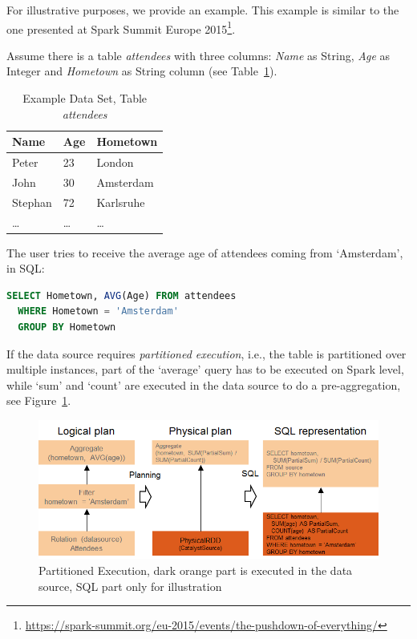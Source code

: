 \documentclass{article}
\begin{document}
For illustrative purposes, we provide an example. This example is similar to the one presented at Spark Summit Europe 2015\footnote{\url{https://spark-summit.org/eu-2015/events/the-pushdown-of-everything/}}. 

Assume there is a table \textit{attendees} with three columns: \textit{Name} as String, \textit{Age} as Integer and \textit{Hometown} as String column (see Table~\ref{tab:exampleData}).

\begin{table}[htb]
\centering
	\begin{tabular}{ l | l | l }
  		\textbf{Name} & \textbf{Age} & \textbf{Hometown} \\
  		\hline
  		Peter & 23 & London \\
  		\hline
  		John & 30 & Amsterdam \\
  		\hline
  		Stephan & 72 & Karlsruhe \\
  		\hline
  		\ldots & \ldots & \ldots \\
	\end{tabular}
	\caption{Example Data Set, Table \textit{attendees}}
	\label{tab:exampleData}
\end{table} 

The user tries to receive the average age of attendees coming from `Amsterdam', in SQL: 

\begin{lstlisting}[frame=none,language=sql]
SELECT Hometown, AVG(Age) FROM attendees 
  WHERE Hometown = 'Amsterdam' 
  GROUP BY Hometown
\end{lstlisting}

If the data source requires \textit{partitioned execution}, i.e., the table is partitioned over multiple instances, part of the `average' query has to be executed on Spark level, while `sum' and `count' are executed in the data source to do a pre-aggregation, see Figure~\ref{fig:partitionedExecution}.

\begin{figure}[htp]
\centering
  \includegraphics[width=1.0\textwidth]{images/partitionedExecution.png}
  \caption{Partitioned Execution, dark orange part is executed in the data source, SQL part only for illustration}
  \label{fig:partitionedExecution}
\end{figure}
\end{document}
